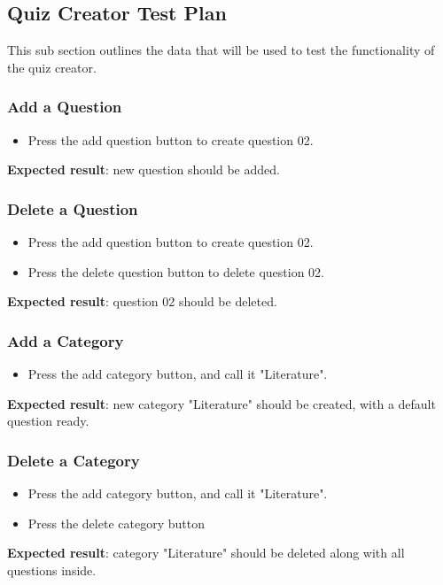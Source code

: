 \subsection{Quiz Creator Test Plan}
This sub section outlines the data that will be used to test the functionality of the quiz creator.

\subsubsection{Add a Question}
\begin{itemize}
\item Press the add question button to create question 02.
\end{itemize}
\textbf{Expected result}: new question should be added.

\subsubsection{Delete a Question}
\begin{itemize}
\item Press the add question button to create question 02.
\item Press the delete question button to delete question 02.
\end{itemize}
\textbf{Expected result}: question 02 should be deleted.

\subsubsection{Add a Category}
\begin{itemize}
\item Press the add category button, and call it "Literature".
\end{itemize}
\textbf{Expected result}: new category "Literature" should be created, with a default question ready.

\subsubsection{Delete a Category}
\begin{itemize}
\item Press the add category button, and call it "Literature".
\item Press the delete category button
\end{itemize}
\textbf{Expected result}: category "Literature" should be deleted along with all questions inside.

